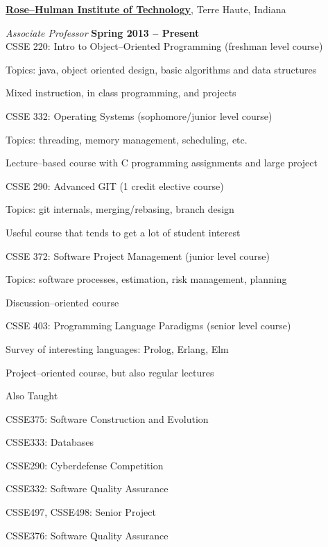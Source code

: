 \documentclass[10pt]{article}
\newenvironment{outerlist}[1][\enskip\textbullet]%
        {\begin{itemize}[#1]}{\end{itemize}%
         \vspace{-.6\baselineskip}}
\newenvironment{innerlist}[1][\enskip\textbullet]%
        {\begin{compactitem}[#1]}{\end{compactitem}}
\begin{document}
\href{http://www.rose-hulman.edu}{\textbf{Rose--Hulman Institute of Technology}},
Terre Haute, Indiana
\begin{outerlist}
\item[] \textit{Associate Professor}%
    \hfill \textbf{Spring 2013 -- Present}\\

    CSSE 220: Intro to Object--Oriented Programming (freshman level course)
    \begin{innerlist}
    \item Topics: java, object oriented design, basic algorithms and data structures
    \item Mixed instruction, in class programming, and projects
    \end{innerlist}

    CSSE 332: Operating Systems (sophomore/junior level course)
    \begin{innerlist}
    \item Topics: threading, memory management, scheduling, etc.
    \item Lecture--based course with C programming assignments and large project
    \end{innerlist}
    
    CSSE 290: Advanced GIT (1 credit elective course)
    \begin{innerlist}
    \item Topics: git internals, merging/rebasing, branch design
    \item Useful course that tends to get a lot of student interest
    \end{innerlist}

    CSSE 372: Software Project Management (junior level course)
    \begin{innerlist}
    \item Topics: software processes, estimation, risk management, planning
    \item Discussion--oriented course
    \end{innerlist}

    CSSE 403: Programming Language Paradigms (senior level course)
    \begin{innerlist}
    \item Survey of interesting languages: Prolog, Erlang, Elm
    \item Project--oriented course, but also regular lectures
    \end{innerlist}

    Also Taught
    \begin{innerlist}
    \item CSSE375: Software Construction and Evolution
    \item CSSE333: Databases 
    \item CSSE290: Cyberdefense Competition
    \item CSSE332: Software Quality Assurance
    \item CSSE497, CSSE498: Senior Project
    \item CSSE376: Software Quality Assurance
    \end{innerlist}


\end{outerlist}
\end{document}
